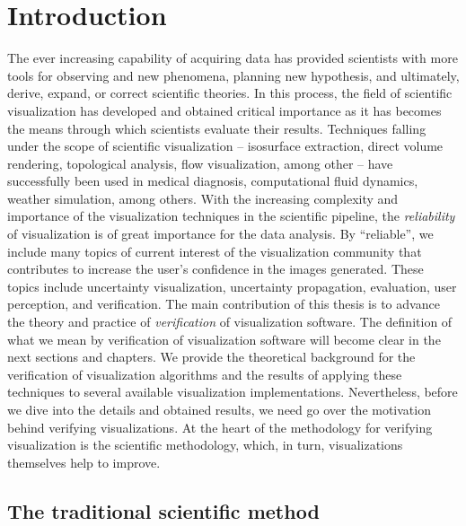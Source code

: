 \chapter{Introduction}

The ever increasing capability of acquiring data has provided scientists with more tools for observing and new phenomena, planning new hypothesis, and ultimately,  derive, expand, or correct scientific theories. In this process, the field of scientific visualization has developed and obtained critical importance as it has becomes the means through which scientists evaluate their results. Techniques falling under the scope of scientific visualization -- isosurface extraction, direct volume rendering, topological analysis, flow visualization, among other -- have successfully been used in medical diagnosis, computational fluid dynamics, weather simulation, among others. With the increasing complexity and importance of the visualization techniques in the scientific pipeline, the \emph{reliability} of visualization is of great importance for the data analysis. By ``reliable'', we include many topics of current interest of the visualization community that contributes to increase the user's confidence in the images generated. These topics include uncertainty visualization, uncertainty propagation, evaluation, user perception, and verification. The main contribution of this thesis is to advance the theory and practice of \emph{verification} of visualization software.  The definition of what we mean by verification of visualization software will become clear in the next sections and chapters. We provide the theoretical background for the verification of visualization algorithms and the results of applying these techniques to several available visualization implementations. Nevertheless, before we dive into the details and obtained results, we need go over the motivation behind verifying visualizations. At the heart of the methodology for verifying visualization is the scientific methodology, which, in turn, visualizations themselves help to improve.

\section{The traditional scientific method}


